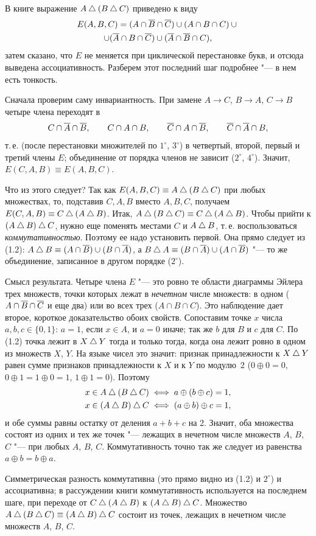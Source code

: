 \begin{solution}
В книге выражение $A\mathbin{\triangle}(B\mathbin{\triangle} C)$ приведено к виду
\begin{multline*}
E(A,B,C)=(A\cap\overline{B}\cap\overline{C})\cup(A\cap B\cap C)\cup{}\\
\cup(\overline{A}\cap B\cap\overline{C})\cup(\overline{A}\cap\overline{B}\cap C),
\end{multline*}
затем сказано, что $E$ не меняется при циклической перестановке букв, и
отсюда выведена ассоциативность. Разберем этот последний шаг подробнее
"--- в нем есть тонкость.

Сначала проверим саму инвариантность. При замене $A\to C$, $B\to A$,
$C\to B$ четыре члена переходят в
\[
C\cap\overline{A}\cap\overline{B},\qquad C\cap A\cap B,\qquad \overline{C}\cap A\cap\overline{B},\qquad
\overline{C}\cap\overline{A}\cap B,
\]
т.\,е. (после перестановки множителей по $1^\circ$, $3^\circ$)
в четвертый, второй, первый и третий члены $E$; объединение от порядка
членов не зависит ($2^\circ$, $4^\circ$). Значит, $E(C,A,B)\equiv E(A,B,C)$.

Что из этого следует? Так как $E(A,B,C)\equiv A\mathbin{\triangle}(B\mathbin{\triangle} C)$ при любых
множествах, то, подставив $C,A,B$ вместо $A,B,C$, получаем
$E(C,A,B)\equiv C\mathbin{\triangle}(A\mathbin{\triangle} B)$. Итак, $A\mathbin{\triangle}(B\mathbin{\triangle} C)\equiv C\mathbin{\triangle}(A\mathbin{\triangle} B)$.
Чтобы прийти к $(A\mathbin{\triangle} B)\mathbin{\triangle} C$, нужно еще поменять местами $C$ и $A\mathbin{\triangle} B$,
т.\,е. воспользоваться \emph{коммутативностью}. Поэтому ее надо установить
первой. Она прямо следует из (1.2): $A\mathbin{\triangle} B\equiv(A\cap\overline{B})\cup(B\cap\overline{A})$,
а $B\mathbin{\triangle} A\equiv(B\cap\overline{A})\cup(A\cap\overline{B})$ "--- то же объединение,
записанное в другом порядке ($2^\circ$).

Смысл результата. Четыре члена $E$ "--- это ровно те области диаграммы
Эйлера трех множеств, точки которых лежат в \emph{нечетном} числе
множеств: в одном ($A\cap\overline{B}\cap\overline{C}$ и еще два) или во всех трех
($A\cap B\cap C$). Это наблюдение дает второе, короткое доказательство
обоих свойств. Сопоставим точке $x$ числа $a,b,c\in\{0,1\}$: $a=1$, если
$x\in A$, и $a=0$ иначе; так же $b$ для $B$ и $c$ для $C$. По (1.2) точка
лежит в $X\mathbin{\triangle} Y$ тогда и только тогда, когда она лежит ровно в одном из
множеств $X$, $Y$. На языке чисел это значит: признак принадлежности к
$X\mathbin{\triangle} Y$ равен сумме признаков принадлежности к $X$ и к $Y$ по модулю~2
($0\oplus0=0$, $0\oplus1=1\oplus0=1$, $1\oplus1=0$). Поэтому
\begin{gather*}
x\in A\mathbin{\triangle}(B\mathbin{\triangle} C)\iff a\oplus(b\oplus c)=1,\\
x\in(A\mathbin{\triangle} B)\mathbin{\triangle} C\iff(a\oplus b)\oplus c=1,
\end{gather*}
и обе суммы равны остатку от деления $a+b+c$ на 2. Значит, оба множества
состоят из одних и тех же точек "--- лежащих в нечетном числе множеств
$A$, $B$, $C$ "--- при любых $A$, $B$, $C$. Коммутативность точно так же
следует из равенства $a\oplus b=b\oplus a$.

\answer Симметрическая разность коммутативна (это прямо видно из (1.2)
и $2^\circ$) и ассоциативна; в рассуждении книги коммутативность
используется на последнем шаге, при переходе от $C\mathbin{\triangle}(A\mathbin{\triangle} B)$
к $(A\mathbin{\triangle} B)\mathbin{\triangle} C$. Множество $A\mathbin{\triangle}(B\mathbin{\triangle} C)\equiv(A\mathbin{\triangle} B)\mathbin{\triangle} C$ состоит из
точек, лежащих в нечетном числе множеств $A$, $B$, $C$.
\end{solution}

